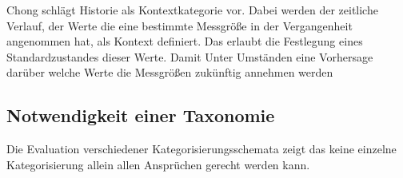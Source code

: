 Chong\cite{chong_context-aware_nodate} schlägt Historie als Kontextkategorie vor. Dabei werden der zeitliche Verlauf, der Werte die eine bestimmte Messgröße in der Vergangenheit angenommen hat, als Kontext definiert. Das erlaubt die Festlegung eines Standardzustandes dieser Werte. Damit  Unter Umständen eine Vorhersage darüber welche Werte die Messgrößen zukünftig annehmen werden
\subsection{Notwendigkeit einer Taxonomie}
Die Evaluation verschiedener Kategorisierungsschemata zeigt das keine einzelne Kategorisierung allein allen Ansprüchen gerecht werden kann\cite{perera_context_2014}.




